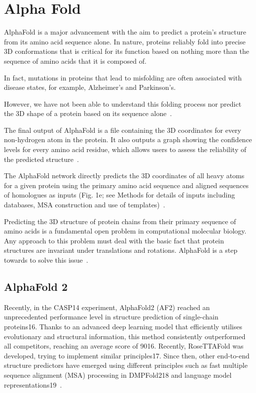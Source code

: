 \documentclass{report}
\begin{document}
\section{Alpha Fold}

AlphaFold is a major advancement with the aim to predict a protein’s structure from its amino acid sequence alone. In nature, proteins reliably fold into precise 3D conformations that is critical for its function based on nothing more than the sequence of amino acids that it is composed of. 

In fact, mutations in proteins that lead to misfolding are often associated with disease states, for example, Alzheimer’s and Parkinson’s. 

However, we have not been able to understand this folding process nor predict the 3D shape of a protein based on its sequence alone~\cite{felix_brief_nodate}.

The final output of AlphaFold is a file containing the 3D coordinates for every non-hydrogen atom in the protein. It also outputs a graph showing the confidence levels for every amino acid residue, which allows users to assess the reliability of the predicted structure~\cite{felix_brief_nodate}.

The AlphaFold network directly predicts the 3D coordinates of all heavy atoms for a given protein using the primary amino acid sequence and aligned sequences of homologues as inputs (Fig. 1e; see Methods for details of inputs including databases, MSA construction and use of templates)~\cite{jumper_highly_2021}.

Predicting the 3D structure of protein chains from their primary sequence of amino acids is a fundamental open problem in computational molecular biology. Any approach to this problem must deal with the basic fact that protein structures are invariant under translations and rotations. AlphaFold is a step towards to solve this issue~\cite{baldi_principled_nodate}.

\subsection{AlphaFold 2}

Recently, in the CASP14 experiment, AlphaFold2 (AF2) reached an unprecedented performance level in structure prediction of single-chain proteins16. Thanks to an advanced deep learning model that efficiently utilises evolutionary and structural information, this method consistently outperformed all competitors, reaching an average score of 9016. Recently, RoseTTAFold was developed, trying to implement similar principles17. Since then, other end-to-end structure predictors have emerged using different principles such as fast multiple sequence alignment (MSA) processing in DMPFold218 and language model representations19~\cite{bryant_improved_2022}.
\end{document}
